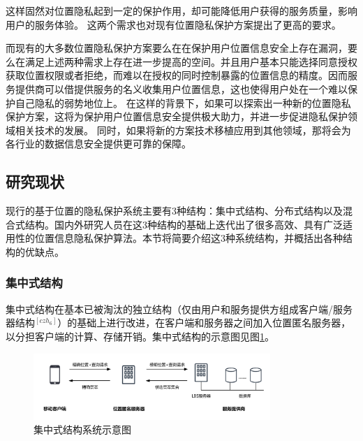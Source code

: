 \documentclass[zihao=-4]{ctexart}
\begin{document}
这样固然对位置隐私起到一定的保护作用，却可能降低用户获得的服务质量，影响用户的服务体验。
这两个需求也对现有位置隐私保护方案提出了更高的要求。
\par
而现有的大多数位置隐私保护方案要么在在保护用户位置信息安全上存在漏洞，要么在满足上述两种需求上存在进一步提高的空间。并且用户基本只能选择同意授权获取位置权限或者拒绝，而难以在授权的同时控制暴露的位置信息的精度。因而服务提供商可以借提供服务的名义收集用户位置信息，这也使得用户处在一个难以保护自己隐私的弱势地位上。
在这样的背景下，如果可以探索出一种新的位置隐私保护方案，这将为保护用户位置信息安全提供极大助力，并进一步促进隐私保护领域相关技术的发展。
同时，如果将新的方案技术移植应用到其他领域，那将会为各行业的数据信息安全提供更可靠的保障。


\subsection{研究现状}

现行的基于位置的隐私保护系统主要有3种结构：集中式结构、分布式结构以及混合式结构。国内外研究人员在这3种结构的基础上迭代出了很多高效、具有广泛适用性的位置信息隐私保护算法。本节将简要介绍这3种系统结构，并概括出各种结构的优缺点。

\subsubsection{集中式结构}
集中式结构在基本已被淘汰的独立结构（仅由用户和服务提供方组成客户端/服务器结构$^{[czh_6]}$）的基础上进行改进，在客户端和服务器之间加入位置匿名服务器，以分担客户端的计算、存储开销。集中式结构的示意图见图\ref{集中式结构}。

\begin{figure}[H] %
	\centering %
	\includegraphics[width=0.8\textwidth]{./include_picture/集中式结构（绪论-研究现状）} %
	\caption{集中式结构系统示意图} %
	\label{集中式结构} %
\end{figure}
\end{document}
